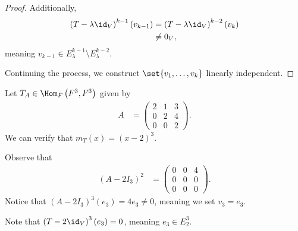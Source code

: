 \documentclass[10pt]{mypackage}
\begin{document}
\begin{proof}
  Additionally,
  \begin{align*}
    \left(T - \lambda \id_{V}\right)^{k-1}\left(v_{k-1}\right) &= \left(T -\lambda \id_V\right)^{k-2}\left(v_{k}\right)\\
                                                               &\neq 0_{V},
  \end{align*}
  meaning $v_{k-1}\in E_{\lambda}^{k-1}\setminus E_{\lambda}^{k-2}$.\newline

  Continuing the process, we construct $\set{v_1,\dots,v_k}$ linearly independent.
\end{proof}
\begin{example}
  Let $T_A\in \Hom_{F}\left(F^3,F^3\right)$ given by
  \begin{align*}
    A &= \begin{pmatrix}2 & 1 & 3 \\ 0 & 2 & 4 \\ 0 & 0 & 2\end{pmatrix}.
  \end{align*}
  We can verify that $m_{T}\left(x\right) = \left(x-2\right)^3$.\newline

  Observe that
  \begin{align*}
    \left(A - 2 I_{3}\right)^2 &= \begin{pmatrix}0 & 0 & 4 \\ 0 & 0 & 0 \\ 0 & 0 & 0\end{pmatrix}.
  \end{align*}
  Notice that $\left(A - 2I_3\right)^{3}\left(e_3\right) = 4e_3\neq 0$, meaning we set $v_3 = e_3$.\newline

  Note that $\left(T - 2\id_V\right)^{3}\left(e_3\right) = 0$, meaning $e_3\in E_{2}^{3}$.\newline


\end{example}
\end{document}
